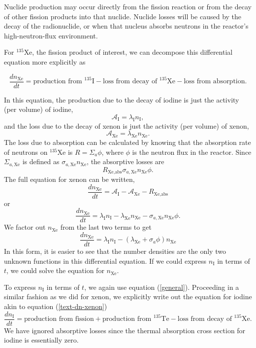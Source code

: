 \documentclass{report}
\begin{document}
Nuclide production may occur directly from the fission reaction or from the decay of other fission products into that nuclide. Nuclide losses will be caused by the decay of the radionuclide, or when that nucleus absorbs neutrons in the reactor's high-neutron-flux environment.

For $^{135}$Xe, the fission product of interest, we can decompose this differential equation more explicitly as

\begin{equation}
\label{text-dn-xenon}
\frac{dn_{\text{Xe}}}{dt} = \text{production from }^{135}\text{I} - \text{loss from decay of }^{135}\text{Xe} - \text{loss from absorption} .
\end{equation}

In this equation, the production due to the decay of iodine is just the activity (per volume) of iodine,
$$ \mathcal{A}_{\text{I}} = \lambda_{\text{I}}n_{\text{I}}, $$
and the loss due to the decay of xenon is just the activity (per volume) of xenon,
$$ \mathcal{A}_{\text{Xe}} = \lambda_{\text{Xe}}n_{\text{Xe}}. $$
The loss due to absorption can be calculated by knowing that the absorption rate of neutrons on $^{135}$Xe is $R = \Sigma_a \phi$, where $\phi$ is the neutron flux in the reactor. Since $\Sigma_{a,\text{Xe}}$ is defined as $\sigma_{a,\text{Xe}} n_{\text{Xe}}$, the absorptive losses are
$$ R_{\text{Xe,abs}} \sigma_{a,\text{Xe}} n_{\text{Xe}} \phi .$$
The full equation for xenon can be written,
$$ \frac{dn_{\text{Xe}}}{dt} = \mathcal{A}_{\text{I}} - \mathcal{A}_{\text{Xe}} - R_{\text{Xe,abs}} $$
or
$$ \frac{dn_{\text{Xe}}}{dt} = \lambda_{\text{I}}n_{\text{I}} - \lambda_{\text{Xe}}n_{\text{Xe}} - \sigma_{a,\text{Xe}} n_{\text{Xe}} \phi .$$
We factor out $n_{\text{Xe}}$ from the last two terms to get
\begin{equation}
\label{dn-xenon}
\frac{dn_{\text{Xe}}}{dt} = \lambda_{\text{I}}n_{\text{I}} - (\lambda_{\text{Xe}} + \sigma_a\phi) n_{\text{Xe}}
\end{equation}
In this form, it is easier to see that the number densities are the only two unknown functions in this differential equation. If we could express $n_{\text{I}}$ in terms of $t$, we could solve the equation for $n_{\text{Xe}}$.

To express $n_{\text{I}}$ in terms of $t$, we again use equation (\ref{general}). Proceeding in a similar fashion as we did for xenon, we explicitly write out the equation for iodine akin to equation (\ref{text-dn-xenon})
\begin{equation}
\label{text-dn-iodine}
\frac{dn_{\text{I}}}{dt} = \text{production from fission} + \text{production from }^{135}\text{Te} - \text{loss from decay of }^{135}\text{Xe}.
\end{equation}
We have ignored absorptive losses since the thermal absorption cross section for iodine is essentially zero. 
\end{document}

